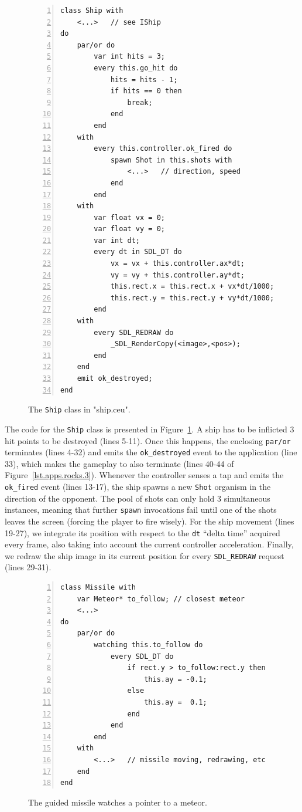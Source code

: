 \documentclass[preprint]{sigplanconf}
\newcommand{\code}[1] {{\small{\texttt{#1}}}}
\newcommand{\1}{\;}
\newcommand{\2}{\;\;}
\newcommand{\3}{\;\;\;}
\newcommand{\5}{\;\;\;\;\;}
\begin{document}
\begin{figure}%
\begin{lstlisting}[numbers=left,xleftmargin=3em]
class Ship with
    <...>   // see IShip
do
    par/or do
        var int hits = 3;
        every this.go_hit do
            hits = hits - 1;
            if hits == 0 then
                break;
            end
        end
    with
        every this.controller.ok_fired do
            spawn Shot in this.shots with
                <...>   // direction, speed
            end
        end
    with
        var float vx = 0;
        var float vy = 0;
        var int dt;
        every dt in SDL_DT do
            vx = vx + this.controller.ax*dt;
            vy = vy + this.controller.ay*dt;
            this.rect.x = this.rect.x + vx*dt/1000;
            this.rect.y = this.rect.y + vy*dt/1000;
        end
    with
        every SDL_REDRAW do
            _SDL_RenderCopy(<image>,<pos>);
        end
    end
    emit ok_destroyed;
end
\end{lstlisting}
\caption{ The \code{Ship} class in "ship.ceu".
\label{lst.apps.rocks.4}
}
\end{figure}

The code for the \code{Ship} class is presented in 
Figure~\ref{lst.apps.rocks.4}.
%
A ship has to be inflicted 3 hit points to be destroyed (lines 5-11).
Once this happens, the enclosing \code{par/or} terminates (lines 4-32) and 
emits the \code{ok\_destroyed} event to the application (line 33), which makes 
the gameplay to also terminate (lines 40-44 of Figure~\ref{lst.apps.rocks.3}).
%
Whenever the controller senses a tap and emits the \code{ok\_fired} event 
(lines 13-17), the ship spawns a new \code{Shot} organism in the direction of 
the opponent.
The pool of shots can only hold 3 simultaneous instances, meaning that further
\code{spawn} invocations fail until one of the shots leaves the screen (forcing 
the player to fire wisely).
%
For the ship movement (lines 19-27), we integrate its position with respect to 
the \code{dt} ``delta time'' acquired every frame, also taking into account the 
current controller acceleration.
%
Finally, we redraw the ship image in its current position for every 
\code{SDL\_REDRAW} request (lines 29-31).

\begin{figure}%
\begin{lstlisting}[numbers=left,xleftmargin=3em]
class Missile with
    var Meteor* to_follow; // closest meteor
    <...>
do
    par/or do
        watching this.to_follow do
            every SDL_DT do
                if rect.y > to_follow:rect.y then
                    this.ay = -0.1;
                else
                    this.ay =  0.1;
                end
            end
        end
    with
        <...>   // missile moving, redrawing, etc
    end
end
\end{lstlisting}
\caption{ The guided missile watches a pointer to a meteor.
\label{lst.apps.rocks.5}
}
\end{figure}
\end{document}
